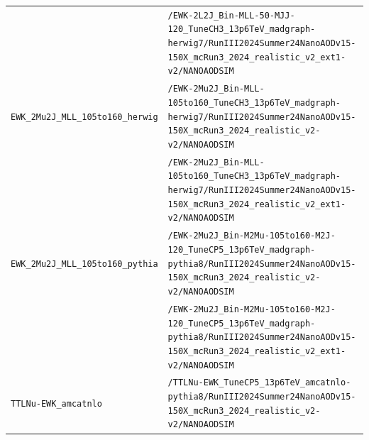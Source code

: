 \begin{longtable}{@{}>{\RaggedRight\arraybackslash}p{} >{\RaggedRight\arraybackslash}p{}@{}}
 & \texttt{/\allowbreak{}EWK-\allowbreak{}2L2J\_\allowbreak{}Bin-\allowbreak{}MLL-\allowbreak{}50-\allowbreak{}MJJ-\allowbreak{}120\_\allowbreak{}TuneCH3\_\allowbreak{}13p6TeV\_\allowbreak{}madgraph-\allowbreak{}herwig7/\allowbreak{}RunIII2024Summer24NanoAODv15-\allowbreak{}150X\_\allowbreak{}mcRun3\_\allowbreak{}2024\_\allowbreak{}realistic\_\allowbreak{}v2\_\allowbreak{}ext1-\allowbreak{}v2/\allowbreak{}NANOAODSIM} \\
\addlinespace[2pt]
\texttt{EWK\_\allowbreak{}2Mu2J\_\allowbreak{}MLL\_\allowbreak{}105to160\_\allowbreak{}herwig} & \texttt{/\allowbreak{}EWK-\allowbreak{}2Mu2J\_\allowbreak{}Bin-\allowbreak{}MLL-\allowbreak{}105to160\_\allowbreak{}TuneCH3\_\allowbreak{}13p6TeV\_\allowbreak{}madgraph-\allowbreak{}herwig7/\allowbreak{}RunIII2024Summer24NanoAODv15-\allowbreak{}150X\_\allowbreak{}mcRun3\_\allowbreak{}2024\_\allowbreak{}realistic\_\allowbreak{}v2-\allowbreak{}v2/\allowbreak{}NANOAODSIM} \\
 & \texttt{/\allowbreak{}EWK-\allowbreak{}2Mu2J\_\allowbreak{}Bin-\allowbreak{}MLL-\allowbreak{}105to160\_\allowbreak{}TuneCH3\_\allowbreak{}13p6TeV\_\allowbreak{}madgraph-\allowbreak{}herwig7/\allowbreak{}RunIII2024Summer24NanoAODv15-\allowbreak{}150X\_\allowbreak{}mcRun3\_\allowbreak{}2024\_\allowbreak{}realistic\_\allowbreak{}v2\_\allowbreak{}ext1-\allowbreak{}v2/\allowbreak{}NANOAODSIM} \\
\addlinespace[2pt]
\texttt{EWK\_\allowbreak{}2Mu2J\_\allowbreak{}MLL\_\allowbreak{}105to160\_\allowbreak{}pythia} & \texttt{/\allowbreak{}EWK-\allowbreak{}2Mu2J\_\allowbreak{}Bin-\allowbreak{}M2Mu-\allowbreak{}105to160-\allowbreak{}M2J-\allowbreak{}120\_\allowbreak{}TuneCP5\_\allowbreak{}13p6TeV\_\allowbreak{}madgraph-\allowbreak{}pythia8/\allowbreak{}RunIII2024Summer24NanoAODv15-\allowbreak{}150X\_\allowbreak{}mcRun3\_\allowbreak{}2024\_\allowbreak{}realistic\_\allowbreak{}v2-\allowbreak{}v2/\allowbreak{}NANOAODSIM} \\
 & \texttt{/\allowbreak{}EWK-\allowbreak{}2Mu2J\_\allowbreak{}Bin-\allowbreak{}M2Mu-\allowbreak{}105to160-\allowbreak{}M2J-\allowbreak{}120\_\allowbreak{}TuneCP5\_\allowbreak{}13p6TeV\_\allowbreak{}madgraph-\allowbreak{}pythia8/\allowbreak{}RunIII2024Summer24NanoAODv15-\allowbreak{}150X\_\allowbreak{}mcRun3\_\allowbreak{}2024\_\allowbreak{}realistic\_\allowbreak{}v2\_\allowbreak{}ext1-\allowbreak{}v2/\allowbreak{}NANOAODSIM} \\
\addlinespace[2pt]
\texttt{TTLNu-\allowbreak{}EWK\_\allowbreak{}amcatnlo} & \texttt{/\allowbreak{}TTLNu-\allowbreak{}EWK\_\allowbreak{}TuneCP5\_\allowbreak{}13p6TeV\_\allowbreak{}amcatnlo-\allowbreak{}pythia8/\allowbreak{}RunIII2024Summer24NanoAODv15-\allowbreak{}150X\_\allowbreak{}mcRun3\_\allowbreak{}2024\_\allowbreak{}realistic\_\allowbreak{}v2-\allowbreak{}v2/\allowbreak{}NANOAODSIM} \\

\end{longtable}
